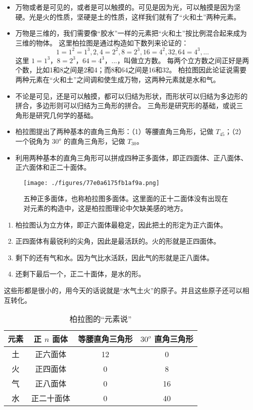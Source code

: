 \begin{itemize}
\item 万物或者是可见的，或者是可以触摸的。可见是因为光，可以触摸是因为坚硬。光是火的性质，坚硬是土的性质，这样我们就有了“火和土”两种元素。

\item 万物是三维的，我们需要像“胶水”一样的元素把“火和土”按比例混合起来成为三维的物体。 这里柏拉图是通过构造如下数列来论证的：
\begin{equation}
1=1^2=1^3, 2, 4=2^2, 8=2^3, 16=4^2, 32, 64=4^3,...
\end{equation}
这里 $1=1^3$，$8=2^3$，$64=4^3$，...，叫做立方数。 每两个立方数之间正好是两个数，比如1和8之间是2和4；而8和64之间是16和32。 柏拉图因此论证说需要两种元素在“火和土”之间调和使生成万物，这两种元素就是水和气。

\item 不论是可见，还是可以触摸，都可以归结为形状，而形状可以归结为多边形的拼合，多边形则可以归结为三角形的拼合。 三角形是研究形的基础，或说三角形是研究几何学的基础。

\item 柏拉图提出了两种基本的直角三角形：（1）等腰直角三角形，记做 $T_{45}$；（2）一个锐角为 $30^o$ 的直角三角形，记做 $T_{30}$。

\item 利用两种基本的直角三角形可以拼成四种正多面体，即正四面体、正八面体、正六面体和正二十面体。
\end{itemize}

\begin{figure}[ht]
\centering
\texttt{[image: ./figures/77e0a6175fb1af9a.png]}
\caption{五种正多面体，也称柏拉图多面体。这里面的正十二面体没有出现在对元素的构造中，这是柏拉图理论中欠缺美感的地方。} \label{fig_AtomId_2}
\end{figure}

\begin{enumerate}
\item 柏拉图认为立方体，即正六面体最稳定，因此把土的形定为正六面体。
\item 正四面体有最锐利的尖角，因此是最活跃的。火的形就是正四面体。
\item 剩下的还有气和水。因为气比水活跃，因此气的形就是正八面体。
\item 还剩下最后一个，正二十面体，是水的形。
\end{enumerate}

这些形都是很小的，用今天的话说就是“水气土火”的原子。并且这些原子还可以相互转化。

\begin{table}[ht]
\centering
\caption{柏拉图的“元素说”}\label{tab_AtomId_1}
\begin{tabular}{|c|c|c|c|}
\hline
元素 & 正 $n$ 面体 & 等腰直角三角形 & $30^o$ 直角三角形 \\
\hline
土 & 正六面体 & 12 & 0  \\
\hline
火 & 正四面体 & 0 & 8 \\
\hline
气 & 正八面体 & 0 & 16 \\
\hline
水 & 正二十面体 & 0 & 40\\
\hline
\end{tabular}
\end{table}

